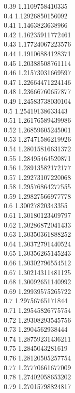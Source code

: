 {0.39	1.1109758410335\\
0.4	1.12926850156092\\
0.41	1.1463823638966\\
0.42	1.16235911772461\\
0.43	1.17724067223576\\
0.44	1.19106884128371\\
0.45	1.20388508761114\\
0.46	1.21573031669597\\
0.47	1.22664471224146\\
0.48	1.23666760657877\\
0.49	1.24583738030104\\
0.5	1.25419138633443\\
0.51	1.26176589439986\\
0.52	1.26859605245001\\
0.53	1.27471586219926\\
0.54	1.28015816631372\\
0.55	1.28495464520871\\
0.56	1.28913582172177\\
0.57	1.29273107220068\\
0.58	1.29576864277555\\
0.59	1.29827566977778\\
0.6	1.30027820343355\\
0.61	1.30180123409797\\
0.62	1.30286872041433\\
0.63	1.30350361888252\\
0.64	1.30372791440524\\
0.65	1.30356265145243\\
0.66	1.30302796554512\\
0.67	1.30214311481125\\
0.68	1.30092651140992\\
0.69	1.29939575265722\\
0.7	1.29756765171844\\
0.71	1.29545826775754\\
0.72	1.29308293545756\\
0.73	1.2904562938444\\
0.74	1.28759231436211\\
0.75	1.2845043281619\\
0.76	1.28120505257754\\
0.77	1.27770661677009\\
0.78	1.27402058653202\\
0.79	1.27015798824817\\
}
